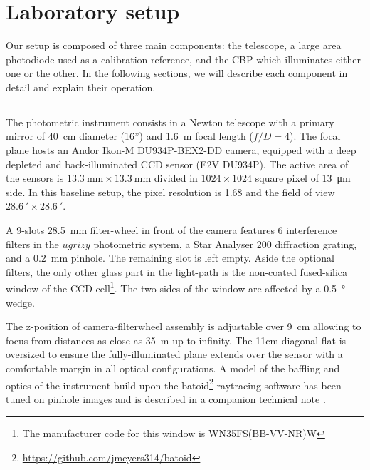 \section{Laboratory setup}
\label{sec:setup}

Our setup is composed of three main components: the \SD telescope, a large area photodiode used as a calibration reference, and the CBP which illuminates either one or the other. In the following sections, we will describe each component in detail and explain their operation.

\subsection{\SD}
\label{sec:stardice}

The \SD photometric instrument consists in a Newton
telescope with a primary mirror of \SI{40}{\centi\meter} diameter
(16'') and \SI{1.6}{\meter} focal length ($f/D = 4$). The focal plane
hosts an Andor Ikon-M DU934P-BEX2-DD camera, equipped with a deep
depleted and back-illuminated CCD sensor (E2V DU934P). The active area
of the sensors is
$\SI{13.3}{\milli\meter}\times\SI{13.3}{\milli\meter}$ divided in
$1024\times 1024$ square pixel of \SI{13}{\micro\meter} side. In this
baseline setup, the pixel resolution is \SI{1.68}{\arcsec} and the
field of view $\SI{28.6}{\arcmin}\times\SI{28.6}{\arcmin}$.

A 9-slots \SI{28.5}{\milli\meter} filter-wheel in front of the camera
features 6 interference filters in the $ugrizy$ photometric system, a
Star Analyser 200 diffraction grating, and a \SI{0.2}{\milli\meter}
pinhole. The remaining slot is left empty. Aside the optional filters,
the only other glass part in the light-path is the non-coated
fused-silica window of the CCD cell\footnote{The manufacturer code for
  this window is WN35FS(BB-VV-NR)W}. The two sides of the window are
affected by a \SI{0.5}{\degree} wedge.

The z-position of camera-filterwheel assembly is adjustable over
\SI{9}{\centi\meter} allowing to focus from distances as close as
\SI{35}{m} up to infinity. The 11cm diagonal flat is oversized to
ensure the fully-illuminated plane extends over the sensor with a
comfortable margin in all optical configurations. A model of the
baffling and optics of the instrument build upon the
batoid\footnote{\url{https://github.com/jmeyers314/batoid}} raytracing
software has been tuned on pinhole images and is described in a
companion technical note \cite{}.

